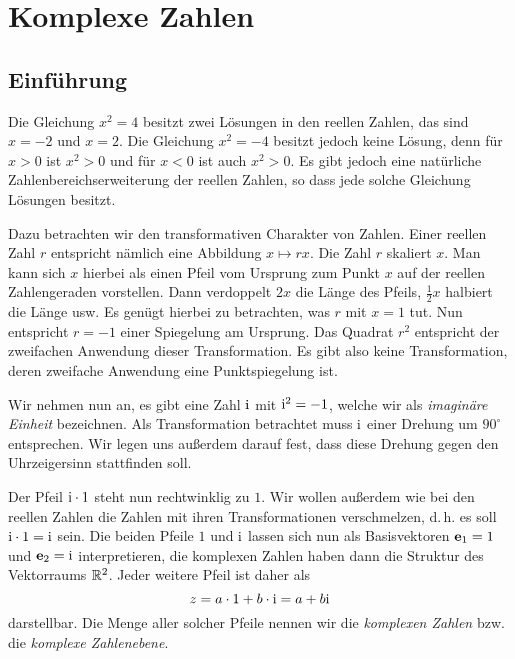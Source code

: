 
\chapter{Komplexe Zahlen}

\section{Einführung}

Die Gleichung $x^2=4$ besitzt zwei Lösungen in den reellen Zahlen,
das sind $x=-2$ und $x=2$. Die Gleichung $x^2=-4$ besitzt jedoch
keine Lösung, denn für $x>0$ ist $x^2>0$ und für $x<0$ ist auch
$x^2>0$. Es gibt jedoch eine natürliche Zahlenbereichserweiterung
der reellen Zahlen, so dass jede solche Gleichung Lösungen besitzt.

Dazu betrachten wir den transformativen Charakter von Zahlen.
Einer reellen Zahl $r$ entspricht nämlich eine Abbildung
$x\mapsto rx$. Die Zahl $r$ skaliert $x$. Man kann sich $x$ hierbei
als einen Pfeil vom Ursprung zum Punkt $x$ auf der reellen
Zahlengeraden vorstellen. Dann verdoppelt $2x$ die Länge des
Pfeils, $\frac{1}{2}x$ halbiert die Länge usw. Es genügt hierbei
zu betrachten, was $r$ mit $x=1$ tut. Nun entspricht $r=-1$ einer
Spiegelung am Ursprung. Das Quadrat $r^2$ entspricht der zweifachen
Anwendung dieser Transformation. Es gibt also keine Transformation,
deren zweifache Anwendung eine Punktspiegelung ist.

Wir nehmen nun an, es gibt eine Zahl $\mathrm{i}$ mit $\mathrm{i}^2=-1$, welche
wir als \emph{imaginäre Einheit} bezeichnen. Als Transformation
betrachtet muss $\mathrm{i}$ einer Drehung um $90^\circ$ entsprechen.
Wir legen uns außerdem darauf fest, dass diese Drehung gegen
den Uhrzeigersinn stattfinden soll.

Der Pfeil $\mathrm{i}\cdot 1$ steht nun rechtwinklig zu $1$. Wir wollen
außerdem wie bei den reellen Zahlen die Zahlen mit ihren
Transformationen verschmelzen, d.\,h. es soll
$\mathrm{i}\cdot 1=\mathrm{i}$ sein. Die beiden Pfeile $1$  und $\mathrm{i}$ lassen sich
nun als Basisvektoren $\mathbf{e}_1=1$ und $\mathbf{e}_2=\mathrm{i}$ interpretieren,
die komplexen Zahlen haben dann die Struktur des Vektorraums $\mathbb R^2$.
Jeder weitere Pfeil ist daher als
\begin{equation}
z = a\cdot 1+b\cdot\mathrm{i} = a+b\mathrm{i}
\end{equation}
darstellbar. Die Menge aller solcher Pfeile nennen wir die
\emph{komplexen Zahlen} bzw. die \emph{komplexe Zahlenebene}.

